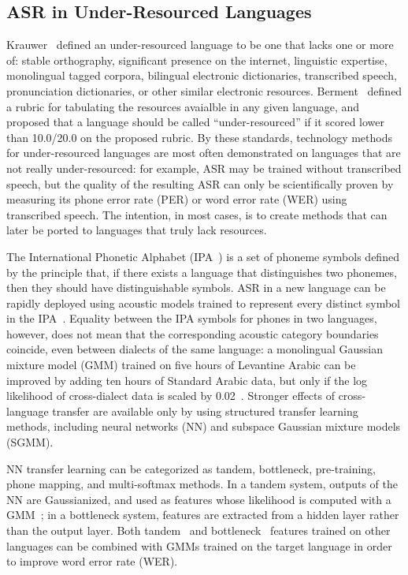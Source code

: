 \subsection{ASR in Under-Resourced Languages}

Krauwer~\cite{Krauwer2003} defined an under-resourced language to be
one that lacks one or more of: stable orthography, significant
presence on the internet, linguistic expertise, monolingual tagged
corpora, bilingual electronic dictionaries, transcribed speech,
pronunciation dictionaries, or other similar electronic resources.
Berment~\cite{Berment2004} defined a rubric for tabulating the
resources avaialble in any given language, and proposed that a
language should be called ``under-resourced'' if it scored lower than
10.0/20.0 on the proposed rubric.  By these standards, technology
methods for under-resourced languages are most often demonstrated on
languages that are not really under-resourced: for example, ASR may be
trained without transcribed speech, but the quality of the resulting
ASR can only be scientifically proven by measuring its phone error
rate (PER) or word error rate (WER) using transcribed speech.  The
intention, in most cases, is to create methods that can later be
ported to languages that truly lack resources.

The International Phonetic Alphabet (IPA~\cite{ipa1993}) is a set of
phoneme symbols defined by the principle that, if there exists a
language that distinguishes two phonemes, then they should have
distinguishable symbols. ASR in a new language can be rapidly deployed
using acoustic models trained to represent every distinct symbol in
the IPA~\cite{Schultz2001}.  Equality between the IPA symbols for
phones in two languages, however, does not mean that the corresponding
acoustic category boundaries coincide, even between dialects of the
same language: a monolingual Gaussian mixture model (GMM) trained on
five hours of Levantine Arabic can be improved by adding ten hours of
Standard Arabic data, but only if the log likelihood of cross-dialect
data is scaled by 0.02~\cite{Huang2012}.  Stronger effects of
cross-language transfer are available only by using structured
transfer learning methods, including neural networks (NN) and subspace
Gaussian mixture models (SGMM).

NN transfer learning can be categorized as tandem, bottleneck,
pre-training, phone mapping, and multi-softmax methods.  In a tandem
system, outputs of the NN are Gaussianized, and used as features whose
likelihood is computed with a GMM~\cite{Hermansky2000}; in a
bottleneck system, features are extracted from a hidden layer rather
than the output layer. Both tandem~\cite{Stolcke2006} and
bottleneck~\cite{Vesely2012} features trained on other languages can
be combined with GMMs trained on the target language in order to
improve word error rate (WER).

